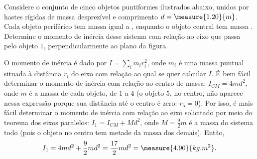 \begin{question}
	Considere o conjunto de cinco objetos puntiformes ilustrados abaixo, unidos por hastes rígidas de massa desprezível e comprimento $d = \measure{1.20}{m}$.
	Cada objeto periférico tem massa igual a , enquanto o objeto central tem massa .
	Determine o momento de inércia desse sistema com relação ao eixo que passa pelo objeto $1$, perpendicularmente ao plano da figura.


	\begin{answer}
	\end{answer}

	\begin{solution}
		O momento de inércia é dado por $I = \sum_i m_i r_i^2$, onde $m_i$ é uma massa puntual situada à distância $r_i$ do eixo com relação ao qual se quer calcular $I$.
		É bem fácil determinar o momento de inércia com relação ao centro de massa: $I_{CM} = 4md^2$, onde $m$ é a massa de cada objeto, de 1 a 4 (o objeto 5, no centro, não aparece nessa expressão porque sua distância até o centro é zero: $r_5 = 0$).
		Por isso, é mais fácil determinar o momento de inércia com relação ao eixo solicitado por meio do teorema dos eixos paralelos: $I_1 = I_{CM} + Md^2$, onde $M = \frac{9}{2}m$ é a massa do sistema todo (pois o objeto no centro tem metade da massa dos demais).
		Então,
		\begin{equation*}
			I_1 = 4md^2 + \frac{9}{2}md^2 = \frac{17}{2}md^2 = \measure{4.90}{kg.m^2}.
		\end{equation*}
	\end{solution}
\end{question}